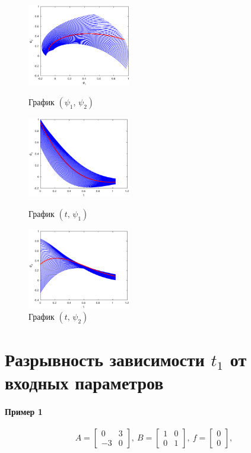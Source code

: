 \documentclass[11pt]{article}
\begin{document}
\begin{figure}[h]
\begin{multicols}{3}
	\hfill
	\includegraphics[width=45mm]{2pp.eps}
	\hfill
	\caption{График $(\psi_1, \, \psi_2)$}
	\hfill
	\includegraphics[width=45mm]{2tp1.eps}
	\hfill
	\caption{График $(t, \, \psi_1)$}
    \hfill
	\includegraphics[width=45mm]{2tp2.eps}
	\hfill
	\caption{График $(t, \, \psi_2)$}
\end{multicols}
\end{figure}	

\newpage
\section{Разрывность зависимости $t_1$ от входных параметров}

\paragraph{Пример 1\\}
\begin{equation}
A = \begin{bmatrix}
0 & 3 \\ -3 & 0
\end{bmatrix},\ 
B = \begin{bmatrix}
1 & 0 \\ 0 & 1
\end{bmatrix}, \
f = \begin{bmatrix}
0 \\ 0
\end{bmatrix},
\end{equation}
\end{document}
